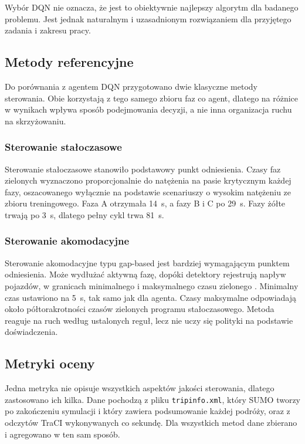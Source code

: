 Wybór DQN nie oznacza, że jest to obiektywnie najlepszy algorytm dla badanego problemu. Jest jednak naturalnym i uzasadnionym rozwiązaniem dla przyjętego zadania i zakresu pracy.

\subsection{Metody referencyjne}
\label{subsec:metody-referencyjne}

Do porównania z agentem DQN przygotowano dwie klasyczne metody sterowania. Obie korzystają z tego samego zbioru faz co agent, dlatego na różnice w wynikach wpływa sposób podejmowania decyzji, a nie inna organizacja ruchu na skrzyżowaniu.

\subsubsection{Sterowanie stałoczasowe}
\label{subsubsec:ref-staloczasowe}

Sterowanie stałoczasowe stanowiło podstawowy punkt odniesienia. Czasy faz zielonych wyznaczono proporcjonalnie do natężenia na pasie krytycznym każdej fazy, oszacowanego wyłącznie na podstawie scenariuszy o wysokim natężeniu ze zbioru treningowego. Faza A otrzymała 14~s, a fazy B i C po 29~s. Fazy żółte trwają po 3~s, dlatego pełny cykl trwa 81~s.

\subsubsection{Sterowanie akomodacyjne}
\label{subsubsec:ref-akomodacyjne}

Sterowanie akomodacyjne typu gap-based jest bardziej wymagającym punktem odniesienia. Może wydłużać aktywną fazę, dopóki detektory rejestrują napływ pojazdów, w granicach minimalnego i maksymalnego czasu zielonego \cite{sumoTrafficLights, NAP22097}. Minimalny czas ustawiono na 5~s, tak samo jak dla agenta. Czasy maksymalne odpowiadają około półtorakrotności czasów zielonych programu stałoczasowego. Metoda reaguje na ruch według ustalonych reguł, lecz nie uczy się polityki na podstawie doświadczenia.

\subsection{Metryki oceny}
\label{subsec:metryki}

Jedna metryka nie opisuje wszystkich aspektów jakości sterowania, dlatego zastosowano ich kilka. Dane pochodzą z pliku \texttt{tripinfo.xml}, który SUMO tworzy po zakończeniu symulacji i który zawiera podsumowanie każdej podróży, oraz z odczytów TraCI wykonywanych co sekundę. Dla wszystkich metod dane zbierano i agregowano w ten sam sposób.

